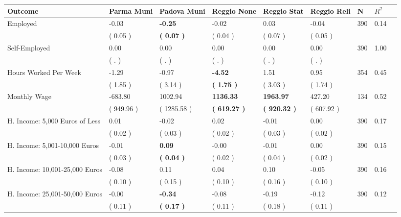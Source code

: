 \begin{tabular}{L{6.2cm} C{1.8cm} C{1.8cm} C{1.8cm} C{1.8cm} C{1.8cm} C{1.8cm} C{0.3cm} C{0.3cm}}
\toprule
 \textbf{Outcome} & \textbf{Parma Muni} & \textbf{Padova Muni} & \textbf{Reggio None} & \textbf{Reggio Stat} & \textbf{Reggio Reli} & \textbf{N} & \textbf{$ R^2$} \\
\midrule
Employed &     -0.03 & \textbf{    -0.25} &     -0.02 &      0.03 &     -0.04  & 390 &       0.14 \\ 
 & (     0.05 ) & \textbf{(     0.07 )} & (     0.04 ) & (     0.07 ) & (     0.05 )  & \\
Self-Employed &      0.00 &      0.00 &      0.00 &      0.00 &      0.00  & 390 &       1.00 \\ 
 & (        . ) & (        . ) & (        . ) & (        . ) & (        . )  & \\
Hours Worked Per Week &     -1.29 &     -0.97 & \textbf{    -4.52} &      1.51 &      0.95  & 354 &       0.45 \\ 
 & (     1.85 ) & (     3.14 ) & \textbf{(     1.75 )} & (     3.03 ) & (     1.74 )  & \\
Monthly Wage &   -683.80 &   1002.94 & \textbf{  1136.33} & \textbf{  1963.97} &    427.20  & 134 &       0.52 \\ 
 & (   949.96 ) & (  1285.58 ) & \textbf{(   619.27 )} & \textbf{(   920.32 )} & (   607.92 )  & \\
H. Income: 5,000 Euros of Less &      0.01 &     -0.02 &      0.02 &     -0.01 &      0.00  & 390 &       0.17 \\ 
 & (     0.02 ) & (     0.03 ) & (     0.02 ) & (     0.03 ) & (     0.02 )  & \\
H. Income: 5,001-10,000 Euros &     -0.01 & \textbf{     0.09} &     -0.00 &     -0.01 &      0.00  & 390 &       0.15 \\ 
 & (     0.03 ) & \textbf{(     0.04 )} & (     0.02 ) & (     0.04 ) & (     0.02 )  & \\
H. Income: 10,001-25,000 Euros &     -0.08 &      0.11 &      0.04 &      0.10 &     -0.05  & 390 &       0.16 \\ 
 & (     0.10 ) & (     0.15 ) & (     0.10 ) & (     0.16 ) & (     0.10 )  & \\
H. Income: 25,001-50,000 Euros &     -0.00 & \textbf{    -0.34} &     -0.08 &     -0.19 &     -0.12  & 390 &       0.12 \\ 
 & (     0.11 ) & \textbf{(     0.17 )} & (     0.11 ) & (     0.18 ) & (     0.11 )  & \\

\end{tabular}
